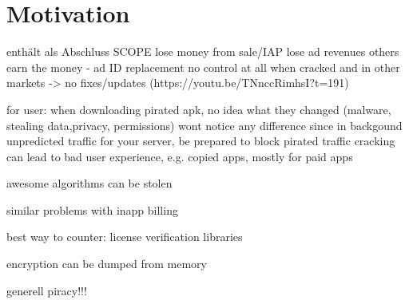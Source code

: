 \section{Motivation}\label{section:motivation}
enthält als Abschluss SCOPE\newline
lose money from sale/IAP\newline
lose ad revenues\newline
others earn the money  - ad ID replacement\newline
no control at all when cracked and in other markets -> no fixes/updates (https://youtu.be/TNnccRimhsI?t=191)\newline

for user: when downloading pirated apk, no idea what they changed (malware, stealing data,privacy, permissions)\newline
wont notice any difference since in backgound\newline
unpredicted traffic for your server, be prepared to block pirated traffic\newline
cracking can lead to bad user experience, e.g. copied apps, mostly for paid apps\newline

awesome algorithms can be stolen\newline

similar problems with inapp billing\newline

best way to counter: license verification libraries\newline

encryption can be dumped from memory\newline

generell piracy!!!\newline
